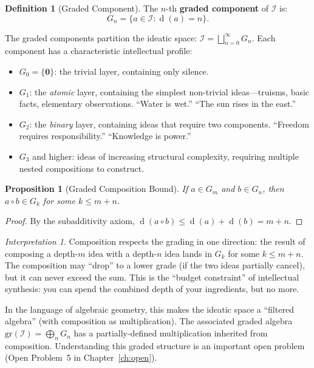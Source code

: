 \documentclass[11pt,openany]{book}
\theoremstyle{definition}
\newtheorem{definition}[axiom]{Definition}
\theoremstyle{plain}
\newtheorem{proposition}[axiom]{Proposition}
\theoremstyle{remark}
\newtheorem{interpretation}[axiom]{Interpretation}
\newcommand{\IS}{\mathcal{I}}               %
\newcommand{\compose}{\circ}                 %
\newcommand{\void}{\mathbf{0}}              %
\newcommand{\depth}{\operatorname{d}}       %
\begin{document}
\begin{definition}[Graded Component]
The $n$-th \textbf{graded component} of $\IS$ is:
\[
G_n = \{a \in \IS : \depth(a) = n\}.
\]
\end{definition}

The graded components partition the ideatic space: $\IS = \bigsqcup_{n=0}^{\infty} G_n$. Each component has a characteristic intellectual profile:

\begin{itemize}
\item $G_0 = \{\void\}$: the trivial layer, containing only silence.
\item $G_1$: the \emph{atomic} layer, containing the simplest non-trivial ideas---truisms, basic facts, elementary observations. ``Water is wet.'' ``The sun rises in the east.''
\item $G_2$: the \emph{binary} layer, containing ideas that require two components. ``Freedom requires responsibility.'' ``Knowledge is power.''
\item $G_3$ and higher: ideas of increasing structural complexity, requiring multiple nested compositions to construct.
\end{itemize}

\begin{proposition}[Graded Composition Bound]
If $a \in G_m$ and $b \in G_n$, then $a \compose b \in G_k$ for some $k \leq m + n$.
\end{proposition}

\begin{proof}
By the subadditivity axiom, $\depth(a \compose b) \leq \depth(a) + \depth(b) = m + n$.
\end{proof}

\begin{interpretation}
Composition respects the grading in one direction: the result of composing a depth-$m$ idea with a depth-$n$ idea lands in $G_k$ for some $k \leq m + n$. The composition may ``drop'' to a lower grade (if the two ideas partially cancel), but it can never exceed the sum. This is the ``budget constraint'' of intellectual synthesis: you can spend the combined depth of your ingredients, but no more.

In the language of algebraic geometry, this makes the ideatic space a ``filtered algebra'' (with composition as multiplication). The associated graded algebra $\mathrm{gr}(\IS) = \bigoplus_n G_n$ has a partially-defined multiplication inherited from composition. Understanding this graded structure is an important open problem (Open Problem~5 in Chapter~\ref{ch:open}).
\end{interpretation}
\end{document}
